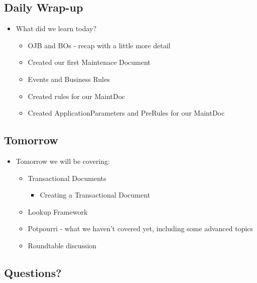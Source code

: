 \documentclass[12pt,notitlepage]{article}
\begin{document}
\begin{s5presentation}
    \W \begin{s5slide}
        \W \section{Daily Wrap-up}
        \begin{ifhtml}
            \begin{itemize}
                \item What did we learn today?
                \begin{itemize}
                    \item OJB and BOs - recap with a little more detail
                    \item Created our first Maintenace Document
                    \item Events and Business Rules
                    \item Created rules for our MaintDoc
                    \item Created ApplicationParameters and PreRules for our MaintDoc
                \end{itemize}
            \end{itemize}
        \end{ifhtml} 
    \W \end{s5slide}
    \begin{s5slide}
        \section{Tomorrow}
            \begin{itemize}
                \item Tomorrow we will be covering:
                \begin{itemize}
                    \item Transactional Documents
                    \begin{itemize}
                        \item Creating a Transactional Document
                    \end{itemize}
                    \item Lookup Framework
                    \item Potpourri - what we haven't covered yet, including some advanced topics
                    \item Roundtable discussion
                \end{itemize}
            \end{itemize}
    \end{s5slide}
    \begin{s5slide}
        \section{Questions?}
            
    \end{s5slide}
    \W \end{s5presentation}
\end{document}

